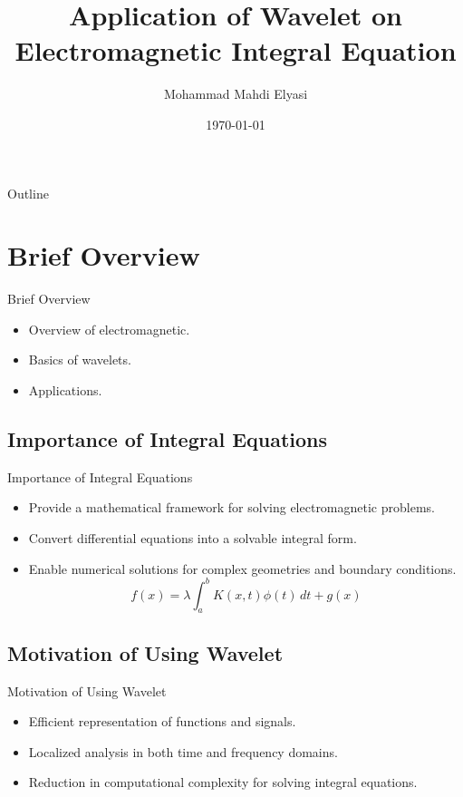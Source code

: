 \documentclass{beamer}
\title[Wavelet on Integral Equation]{Application of Wavelet on Electromagnetic Integral Equation}
\author[]{Mohammad Mahdi Elyasi}
\institute[Amirkabir University of Techonology]{
    Supervisor: Dr. Moradi\\[0.1cm]
    Course: Advanced Engineering Mathematics\\[1cm] %
    Faculty of Electrical Engineering \\ %
}
\date{\today} %
\begin{document}
\begin{frame}
    
    \titlepage
\end{frame}

\begin{frame}{Outline}
    \tableofcontents
\end{frame}

\section{Brief Overview}
\begin{frame}{Brief Overview}
    \begin{itemize}
        \vspace*{-\baselineskip}
        \item Overview of electromagnetic.
        \item Basics of wavelets.
        \item Applications.
    \end{itemize}
\end{frame}

\subsection{Importance of Integral Equations}
\begin{frame}{Importance of Integral Equations}
    \begin{itemize}
        \item Provide a mathematical framework for solving electromagnetic problems.
        \item Convert differential equations into a solvable integral form.
        \item Enable numerical solutions for complex geometries and boundary conditions.
        \[
              f(x) = \lambda \int_a^b K(x, t)\phi(t) \,dt + g(x)
        \]
    \end{itemize}
\end{frame}

\subsection{Motivation of Using Wavelet}
\begin{frame}{Motivation of Using Wavelet}
    \begin{itemize}
        \item Efficient representation of functions and signals.
        \item Localized analysis in both time and frequency domains.
        \item Reduction in computational complexity for solving integral equations.
        
    \end{itemize}
\end{frame}
\end{document}
